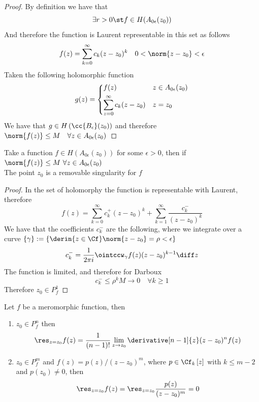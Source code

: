\documentclass[../mmf.tex]{subfiles}
\begin{document}
\begin{proof}
	By definition we have that
	\begin{equation*}
		\exists r>0\st f\in H(A_{0\epsilon}(z_0))
	\end{equation*}
	And therefore the function is Laurent representable in this set as follows
	\begin{equation*}
		f(z)=\sum_{k=0}^{\infty}c_k(z-z_0)^k\quad0<\norm{z-z_0}<\epsilon
	\end{equation*}
	Taken the following holomorphic function
	\begin{equation*}
		g(z)=\begin{dcases}f(z)&z\in A_{0\epsilon}(z_0)\\\sum_{z=0}^{\infty}c_k(z-z_0)&z=z_0\end{dcases}
	\end{equation*}
	We have that $g\in H\left( \cc{B_\epsilon}(z_0) \right)$ and therefore $\norm{f(z)}\le M\quad\forall z\in A_{0\epsilon}(z_0)$
\end{proof}
\begin{lem}[Riemann]
	Take a function $f\in H\left( A_{0\epsilon}(z_0) \right)$ for some $\epsilon>0$, then if $\norm{f(z)}\le M\ \forall z\in A_{0\epsilon}(z_0)$\\
	The point $z_0$ is a removable singularity for $f$
\end{lem}
\begin{proof}
	In the set of holomorphy the function is representable with Laurent, therefore
	\begin{equation*}
		f(z)=\sum_{k=0}^{\infty}c_k^+(z-z_0)^k+\sum_{k=1}^{\infty}\frac{c_k^-}{(z-z_0)^k}
	\end{equation*}
	We have that the coefficients $c_k^-$ are the following, where we integrate over a curve $\{\gamma\}:=\left\{ \derin{z\in\Cf}\norm{z-z_0}=\rho<\epsilon \right\}$
	\begin{equation*}
		c_k^-=\frac{1}{2\pi i}\ointccw_\gamma f(z)(z-z_0)^{k-1}\diff z
	\end{equation*}
	The function is limited, and therefore for Darboux
	\begin{equation*}
		c_k^-\le\rho^k M\to0\quad\forall k\ge1
	\end{equation*}
	Therefore $z_0\in P^1_f$
\end{proof}
\begin{thm}
	Let $f$ be a meromorphic function, then
	\begin{enumerate}
	\item $z_0\in P^n_f$ then
		\begin{equation}
			\res_{z=z_0}f(z)=\frac{1}{(n-1)!}\lim_{z\to z_0}\derivative[n-1]{z}(z-z_0)^nf(z)
			\label{eq:respolen}
		\end{equation}
	\item $z_0\in P^m_f$ and $f(z)=p(z)/(z-z_0)^m$, where $p\in\Cf_k\left[ z \right]$ with $k\le m-2$ and $p(z_0)\ne0$, then
		\begin{equation*}
			\res_{z=z_0}f(z)=\res_{z=z_0}\frac{p(z)}{(z-z_0)^m}=0
		\end{equation*}
	\end{enumerate}
\end{thm}
\end{document}
